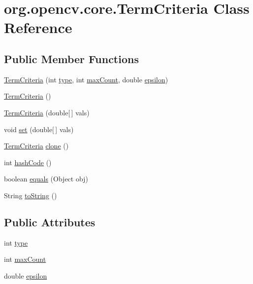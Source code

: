 \hypertarget{classorg_1_1opencv_1_1core_1_1_term_criteria}{}\section{org.\+opencv.\+core.\+Term\+Criteria Class Reference}
\label{classorg_1_1opencv_1_1core_1_1_term_criteria}
\subsection*{Public Member Functions}
\begin{DoxyCompactItemize}
\item 
\mbox{\hyperlink{classorg_1_1opencv_1_1core_1_1_term_criteria_aab618b09e5c0396892be99f3723c1280}{Term\+Criteria}} (int \mbox{\hyperlink{classorg_1_1opencv_1_1core_1_1_term_criteria_a0ec4f89d9e2f07a48fdf3ac94fe1420c}{type}}, int \mbox{\hyperlink{classorg_1_1opencv_1_1core_1_1_term_criteria_a4e0c8aa19649f1be17d3c4f5301c52ec}{max\+Count}}, double \mbox{\hyperlink{classorg_1_1opencv_1_1core_1_1_term_criteria_aafbb2d64dbc1bef799e7378ce70e5545}{epsilon}})
\item 
\mbox{\hyperlink{classorg_1_1opencv_1_1core_1_1_term_criteria_abba54a5a885a351eb8dd7faea5a5220c}{Term\+Criteria}} ()
\item 
\mbox{\hyperlink{classorg_1_1opencv_1_1core_1_1_term_criteria_a5b2a060465f7c9bb947d830cabb5c025}{Term\+Criteria}} (double\mbox{[}$\,$\mbox{]} vals)
\item 
void \mbox{\hyperlink{classorg_1_1opencv_1_1core_1_1_term_criteria_a47eda2e7810cd047bd48694e8fd012c0}{set}} (double\mbox{[}$\,$\mbox{]} vals)
\item 
\mbox{\hyperlink{classorg_1_1opencv_1_1core_1_1_term_criteria}{Term\+Criteria}} \mbox{\hyperlink{classorg_1_1opencv_1_1core_1_1_term_criteria_ae5b02a1631cb0f906979161c4482c94f}{clone}} ()
\item 
int \mbox{\hyperlink{classorg_1_1opencv_1_1core_1_1_term_criteria_a99aca444cf3d7bbba3318cc9120a4f66}{hash\+Code}} ()
\item 
boolean \mbox{\hyperlink{classorg_1_1opencv_1_1core_1_1_term_criteria_a2cce86b2d64109a22c65423606ed9141}{equals}} (Object obj)
\item 
String \mbox{\hyperlink{classorg_1_1opencv_1_1core_1_1_term_criteria_a774d39ad7dd4910aae4a1fa531c6b21b}{to\+String}} ()
\end{DoxyCompactItemize}
\subsection*{Public Attributes}
\begin{DoxyCompactItemize}
\item 
int \mbox{\hyperlink{classorg_1_1opencv_1_1core_1_1_term_criteria_a0ec4f89d9e2f07a48fdf3ac94fe1420c}{type}}
\item 
int \mbox{\hyperlink{classorg_1_1opencv_1_1core_1_1_term_criteria_a4e0c8aa19649f1be17d3c4f5301c52ec}{max\+Count}}
\item 
double \mbox{\hyperlink{classorg_1_1opencv_1_1core_1_1_term_criteria_aafbb2d64dbc1bef799e7378ce70e5545}{epsilon}}
\end{DoxyCompactItemize}
